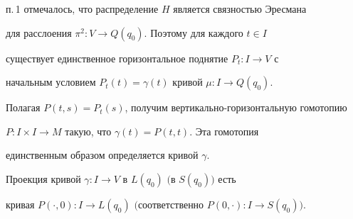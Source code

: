 п.\,1 отмечалось, что распределение $H$ является связностью Эресмана 


для расслоения $\pi^2:V\to Q(q_0)$. Поэтому для каждого $t\in I$ 


существует единственное горизонтальное поднятие $P_t:I\to V$ с 


начальным условием $P_t (t)=\gamma (t)$ кривой $\mu :I\to Q(q_0)$. 


Полагая $P(t,s)=P_t (s)$, получим вертикально-горизонтальную гомотопию 


$P:I\times I\to M$ такую, что $\gamma (t)=P(t,t)$. Эта гомотопия 


единственным образом определяется кривой $\gamma$.





\begin{thm}


Проекция кривой $\gamma:I\to V$ в $L(q_0)$ $($в $S(q_0))$ есть 


кривая $P(\cdot,0):I\to L(q_0)$ $($соответственно $P(0,\cdot ):I\to S(q_0))$.


\end{thm}





